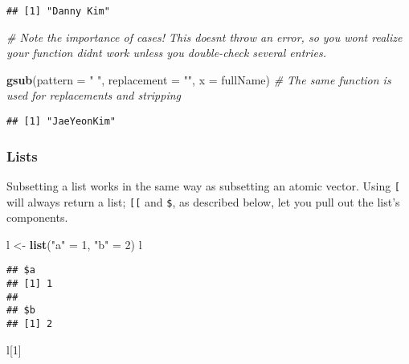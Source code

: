 \documentclass[
]{book}
\newenvironment{Shaded}{\begin{snugshade}}{\end{snugshade}}
\newcommand{\CommentTok}[1]{\textcolor[rgb]{0.56,0.35,0.01}{\textit{#1}}}
\newcommand{\DataTypeTok}[1]{\textcolor[rgb]{0.13,0.29,0.53}{#1}}
\newcommand{\DecValTok}[1]{\textcolor[rgb]{0.00,0.00,0.81}{#1}}
\newcommand{\KeywordTok}[1]{\textcolor[rgb]{0.13,0.29,0.53}{\textbf{#1}}}
\newcommand{\NormalTok}[1]{#1}
\newcommand{\StringTok}[1]{\textcolor[rgb]{0.31,0.60,0.02}{#1}}
\begin{document}
\begin{verbatim}
## [1] "Danny Kim"
\end{verbatim}

\begin{Shaded}
\begin{Highlighting}[]
\CommentTok{\# Note the importance of cases! This doesn\textquotesingle{}t throw an error, so you won\textquotesingle{}t realize your function didn\textquotesingle{}t work unless you double{-}check several entries.}

\KeywordTok{gsub}\NormalTok{(}\DataTypeTok{pattern =} \StringTok{" "}\NormalTok{, }\DataTypeTok{replacement =} \StringTok{""}\NormalTok{, }\DataTypeTok{x =}\NormalTok{ fullName) }\CommentTok{\# The same function is used for replacements and stripping}
\end{Highlighting}
\end{Shaded}

\begin{verbatim}
## [1] "JaeYeonKim"
\end{verbatim}

\hypertarget{lists-1}{%
\subsubsection{Lists}\label{lists-1}}

Subsetting a list works in the same way as subsetting an atomic vector. Using \texttt{{[}} will always return a list; \texttt{{[}{[}} and \texttt{\$}, as described below, let you pull out the list's components.

\begin{Shaded}
\begin{Highlighting}[]
\NormalTok{l \textless{}{-}}\StringTok{ }\KeywordTok{list}\NormalTok{(}\StringTok{"a"}\NormalTok{ =}\StringTok{ }\DecValTok{1}\NormalTok{, }\StringTok{"b"}\NormalTok{ =}\StringTok{ }\DecValTok{2}\NormalTok{)}
\NormalTok{l}
\end{Highlighting}
\end{Shaded}

\begin{verbatim}
## $a
## [1] 1
## 
## $b
## [1] 2
\end{verbatim}

\begin{Shaded}
\begin{Highlighting}[]
\NormalTok{l[}\DecValTok{1}\NormalTok{]}
\end{Highlighting}
\end{Shaded}
\end{document}
